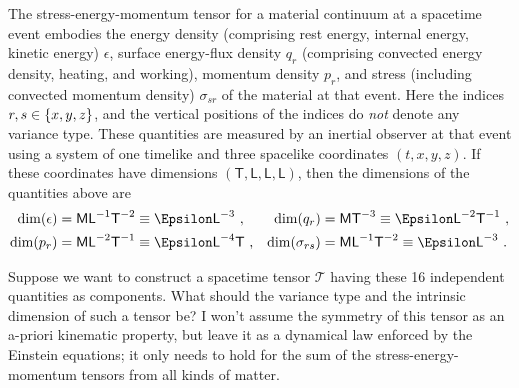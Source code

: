 \documentclass[\ifafour a4paper,12pt,\else a5paper,10pt,\fi%
onecolumn,oneside,article,%
british%
]{memoir}
\theoremstyle{remark}
\theoremstyle{innote}
\DeclarePairedDelimiter\set{\{}{\}}
\renewcommand*{\|}[1][]{\nonscript\,#1\vert\nonscript\;\mathopen{}}
\newcommand*{\Le}{\textsf{L}}
\newcommand*{\Ti}{\textsf{T}}
\newcommand*{\Ma}{\textsf{M}}
\newcommand*{\En}{\Epsilon}%
\newcommand*{\yT}{\bm{\mathcal{T}}}
\newcommand*{\en}{\epsilon}
\newcommand*{\yq}{q}
\newcommand*{\yp}{p}
\newcommand*{\yt}{\sigma}
\begin{document}
The stress-energy-momentum tensor for a material continuum at a spacetime
event embodies the energy density (comprising rest energy, internal energy,
kinetic energy) $\en$, surface energy-flux density $\yq_{r}$ (comprising
convected energy density, heating, and working), momentum density
$\yp_{r}$, and stress (including convected momentum density) $\yt_{sr}$ of
the material at that event. Here the indices $r,s \in \set{x,y,z}$, and the
vertical positions of the indices do \emph{not} denote any variance type.
These quantities are measured by an inertial observer at that event using a
system of one timelike and three spacelike coordinates $(t,x,y,z)$. If
these coordinates have dimensions $(\Ti,\Le,\Le,\Le)$, then the dimensions
of the quantities above are
\begin{equation}\label{eq:dims_stress_components}
  \begin{aligned}
    \dim(\en) &=\Ma\Le^{-1}\Ti^{-2} \equiv  \En\Le^{-3} \ ,
    &
    \dim(\yq_{r}) &=\Ma\Ti^{-3} \equiv  \En\Le^{-2}\Ti^{-1} \ ,
    \\
    \dim(\yp_{r}) &=\Ma\Le^{-2}\Ti^{-1} \equiv  \En\Le^{-4}\Ti \ ,
    &
    \dim(\yt_{rs}) &=\Ma\Le^{-1}\Ti^{-2} \equiv  \En\Le^{-3} \ .
  \end{aligned}
\end{equation}

Suppose we want to construct a spacetime tensor $\yT$ having these 16
independent quantities as components. What should the variance type and the
intrinsic dimension of such a tensor be? I won't assume the symmetry of
this tensor as an a-priori kinematic property, but leave it as a dynamical
law enforced by the Einstein equations; it only needs to hold for the sum
of the stress-energy-momentum tensors from all kinds of matter.
\end{document}
